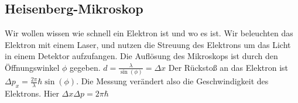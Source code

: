 \subsection{Heisenberg-Mikroskop}

Wir wollen wissen wie schnell ein Elektron ist und wo es ist. Wir beleuchten das Elektron mit einem Laser, und nutzen die Streuung des Elektrons um das Licht in einem Detektor aufzufangen. Die Auflösung des Mikroskops ist durch den Öffnungswinkel $\phi$ gegeben. $d = \frac{\lambda}{\sin(\phi)} = \Delta x$ Der Rückstoß an das Elektron ist $\Delta p_x = \frac{2\pi}{\lambda}\hbar\sin(\phi)$. Die Messung verändert also die Geschwindigkeit des Elektrons. Hier $\Delta x \Delta p = 2\pi\hbar$
















